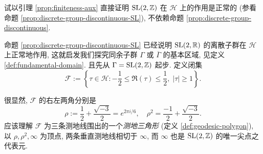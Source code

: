 \begin{exercise}
	试以引理 \ref{prop:finiteness-aux} 直接证明 $\operatorname{SL}(2,\mathbb{Z})$ 在 $\mathcal{H}$ 上的作用是正常的 (参看命题 \ref{prop:discrete-group-discontinuous-SL}), 不依赖命题 \ref{prop:discrete-group-discontinuous}.
\end{exercise}

命题 \ref{prop:discrete-group-discontinuous-SL} 已经说明 $\operatorname{SL}(2,\mathbb{R})$ 的离散子群在 $\mathcal{H}$ 上正常地作用, 这就启发我们探究同余子群 $\Gamma$ 或 $\overline{\Gamma}$ 的基本区域, 见定义 \ref{def:fundamental-domain}. 且先从 $\Gamma = \operatorname{SL}(2,\mathbb{Z})$ 起步. 定义闭集 
\begin{equation}\label{eqn:fundamental-domain-full}
	\mathcal{F} := \left\{ \tau \in \mathcal{H}: -\frac{1}{2} \leq \Re(\tau) \leq \frac{1}{2}, \; |\tau| \geq 1 \right\}.
\end{equation}
\begin{center}\end{center}
很显然, $\mathcal{F}$ 的右左两角分别是 
\[ \rho := \frac{1}{2} + \frac{\sqrt{-3}}{2} = e^{2\pi i/6},  \quad \rho^2 = \frac{-1}{2} + \frac{\sqrt{-3}}{2}. \]
应该理解 $\mathcal{F}$ 为三条测地线围出的一个\emph{测地三角形} (定义 \ref{def:geodesic-polygon}), 以 $\rho, \rho^2, \infty$ 为顶点, 两条垂直测地线相切于 $\infty$, 而 $\infty$ 也是 $\operatorname{SL}(2,\mathbb{Z})$ 的唯一尖点之代表元.

